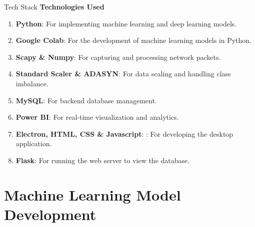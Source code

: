 \documentclass{beamer}
\begin{document}
\begin{frame}{Tech Stack}
\textbf{Technologies Used}
\begin{enumerate}
    \item \textbf{Python}: For implementing machine learning and deep learning models.
    \item \textbf{Google Colab}: For the development of machine learning models in Python.
    \item \textbf{Scapy \& Numpy}: For capturing and processing network packets.
    \item \textbf{Standard Scaler \& ADASYN}: For data scaling and handling class imbalance.
    \item \textbf{MySQL}: For backend database management.
    \item \textbf{Power BI}: For real-time visualization and analytics.
    \item \textbf{Electron, HTML, CSS \& Javascript}: : For developing the desktop application.
    \item \textbf{Flask}: For running the web server to view the database.
\end{enumerate}
\end{frame}

\section{Machine Learning Model Development}
\end{document}

